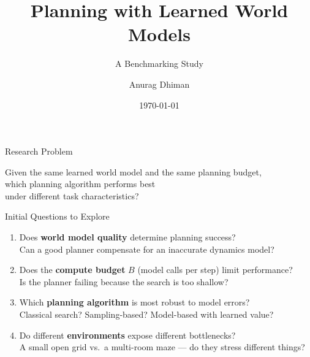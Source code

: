 \documentclass[aspectratio=169, 11pt]{beamer}
\title{Planning with Learned World Models}
\subtitle{A Benchmarking Study}
\author{Anurag Dhiman}
\date{\today}
\begin{document}
{
\begin{frame}
  \titlepage
\end{frame}
}

\begin{frame}{Research Problem}

  \vspace{2em}
  \begin{center}
    \large
    Given the same learned world model and the same planning budget,\\[0.6em]
    which planning algorithm performs best\\[0.6em]
    under different task characteristics?
  \end{center}

\end{frame}

\begin{frame}{Initial Questions to Explore}

  \begin{enumerate}
    \setlength\itemsep{1.1em}

    \item Does \textbf{world model quality} determine planning success?\\
    {\small Can a good planner compensate for an inaccurate dynamics model?}

    \item Does the \textbf{compute budget} $B$ (model calls per step) limit performance?\\
    {\small Is the planner failing because the search is too shallow?}

    \item Which \textbf{planning algorithm} is most robust to model errors?\\
    {\small Classical search? Sampling-based? Model-based with learned value?}

    \item Do different \textbf{environments} expose different bottlenecks?\\
    {\small A small open grid vs.\ a multi-room maze — do they stress different things?}

  \end{enumerate}

\end{frame}
\end{document}
